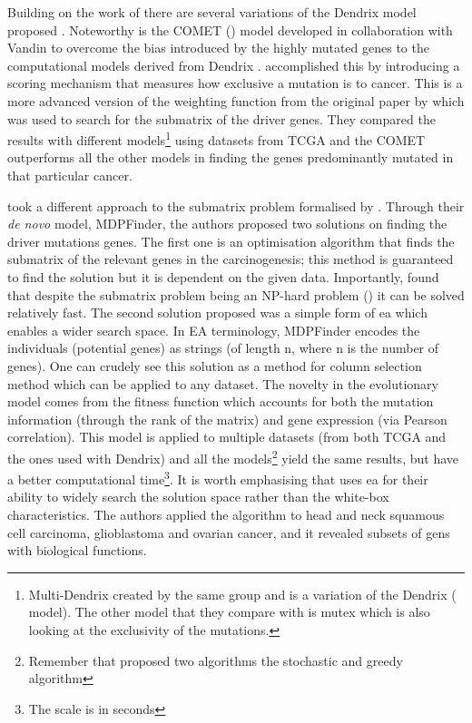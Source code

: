 Building on the work of \citet{Vandin2012-cf} there are several variations of the Dendrix model proposed \cite{Leiserson2013-da,Szczurek2014-dh,Leiserson2015-yk}. Noteworthy is the COMET (\citet{Leiserson2015-yk}) model developed in collaboration with Vandin to overcome the bias introduced by the highly mutated genes to the computational models derived from Dendrix \cite{Vandin2012-ns}. \citet{Leiserson2015-yk} accomplished this by introducing a scoring mechanism that measures how exclusive a mutation is to cancer. This is a more advanced version of the weighting function from the original paper by \citet{Vandin2012-cf} which was used to search for the submatrix of the driver genes. They compared the results with different models\footnote{Multi-Dendrix\cite{Leiserson2013-da} created by the same group and is a variation of the Dendrix (\citet{Vandin2012-cf} model). The other model that they compare with is mutex\cite{Babur2015-qk} which is also looking at the exclusivity of the mutations.} using datasets from TCGA and the COMET outperforms all the other models \cite{Leiserson2013-da,Szczurek2014-dh} in finding the genes predominantly mutated in that particular cancer.

\citet{Zhao2012-wj} took a different approach to the submatrix problem formalised by \citet{Vandin2012-cf}. Through their \textit{de novo} model, MDPFinder\cite{Zhao2012-wj}, the authors proposed two solutions on finding the driver mutations genes. The first one is an optimisation algorithm that finds the submatrix of the relevant genes in the carcinogenesis; this method is guaranteed to find the solution but it is dependent on the given data. Importantly, \citet{Zhao2012-wj} found that despite the submatrix problem being an NP-hard problem (\citet{Vandin2012-cf}) it can be solved relatively fast. The second solution proposed was a simple form of \acrfull{ea} which enables a wider search space. In EA terminology, MDPFinder encodes the individuals (potential genes) as strings (of length n, where n is the number of genes). One can crudely see this solution as a method for column selection method which can be applied to any dataset. The novelty in the evolutionary model comes from the fitness function which accounts for both the mutation information (through the rank of the matrix) and gene expression (via Pearson correlation). This model is applied to multiple datasets (from both TCGA and the ones used with Dendrix\cite{Vandin2012-cf}) and all the models\footnote{Remember that \citet{Vandin2012-cf} proposed two algorithms the stochastic and greedy algorithm} yield the same results, but \citet{Zhao2012-wj} have a better computational time\footnote{The scale is in seconds}. It is worth emphasising that \citet{Zhao2012-wj} uses \acrshort{ea} for their ability to widely search the solution space rather than the white-box characteristics. The authors applied the algorithm to head and neck squamous cell carcinoma, glioblastoma and ovarian cancer, and it revealed subsets of gens with biological functions.

